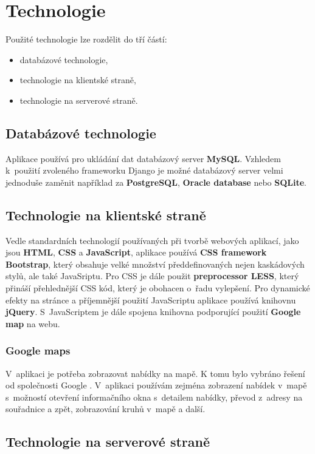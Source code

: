\section{Technologie}
Použité technologie lze rozdělit do tří částí:
\begin{itemize}
    \item databázové technologie,
    \item technologie na klientské straně,
    \item technologie na serverové straně.
\end{itemize}

\subsection{Databázové technologie}
Aplikace používá pro ukládání dat databázový server \textbf{MySQL}. Vzhledem k~použití zvoleného frameworku Django je možné databázový server velmi jednoduše zaměnit například za \textbf{PostgreSQL}, \textbf{Oracle database} nebo \textbf{SQLite}.

\subsection{Technologie na klientské straně}
Vedle standardních technologií používaných při tvorbě webových aplikací, jako jsou \textbf{HTML}, \textbf{CSS} a \textbf{JavaScript}, aplikace používá \textbf{CSS framework Bootstrap}, který obsahuje velké množství předdefinovaných nejen kaskádových stylů, ale také JavaSriptu. Pro CSS je dále použit \textbf{preprocessor LESS}, který přináší přehlednější CSS kód, který je obohacen o~řadu vylepšení. Pro dynamické efekty na stránce a příjemnější použití JavaScriptu aplikace používá knihovnu \textbf{jQuery}. S~JavaScriptem je dále spojena knihovna podporující použití \textbf{Google map} na webu.

\subsubsection{Google maps}
V~aplikaci je potřeba zobrazovat nabídky na mapě. K tomu bylo vybráno řešení od společnosti Google \cite{googlemaps}. V~aplikaci používám zejména zobrazení nabídek v~mapě s~možností otevření informačního okna s~detailem nabídky, převod z~adresy na souřadnice a zpět, zobrazování kruhů v~mapě a další.

\subsection{Technologie na serverové straně}
